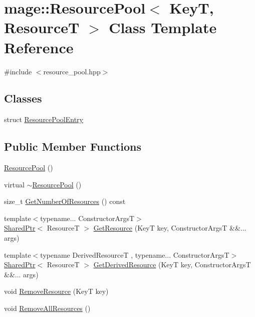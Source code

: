 \hypertarget{classmage_1_1_resource_pool}{}\section{mage\+:\+:Resource\+Pool$<$ KeyT, ResourceT $>$ Class Template Reference}
\label{classmage_1_1_resource_pool}


{\ttfamily \#include $<$resource\+\_\+pool.\+hpp$>$}

\subsection*{Classes}
\begin{DoxyCompactItemize}
\item 
struct \hyperlink{structmage_1_1_resource_pool_1_1_resource_pool_entry}{Resource\+Pool\+Entry}
\end{DoxyCompactItemize}
\subsection*{Public Member Functions}
\begin{DoxyCompactItemize}
\item 
\hyperlink{classmage_1_1_resource_pool_a590c1ebb30254714bedd7f821ff98241}{Resource\+Pool} ()
\item 
virtual \hyperlink{classmage_1_1_resource_pool_ae4fff3d951818d417f77965c2db265f6}{$\sim$\+Resource\+Pool} ()
\item 
size\+\_\+t \hyperlink{classmage_1_1_resource_pool_ae2f9964a1821c9b8cb38303a5a88c98e}{Get\+Number\+Of\+Resources} () const
\item 
{\footnotesize template$<$typename... Constructor\+ArgsT$>$ }\\\hyperlink{namespacemage_a1e01ae66713838a7a67d30e44c67703e}{Shared\+Ptr}$<$ ResourceT $>$ \hyperlink{classmage_1_1_resource_pool_add76506394983fe84bc2cb95cfd5f7e2}{Get\+Resource} (KeyT key, Constructor\+ArgsT \&\&... args)
\item 
{\footnotesize template$<$typename Derived\+ResourceT , typename... Constructor\+ArgsT$>$ }\\\hyperlink{namespacemage_a1e01ae66713838a7a67d30e44c67703e}{Shared\+Ptr}$<$ ResourceT $>$ \hyperlink{classmage_1_1_resource_pool_a2c1116cecf0a88953fa681f254de8680}{Get\+Derived\+Resource} (KeyT key, Constructor\+ArgsT \&\&... args)
\item 
void \hyperlink{classmage_1_1_resource_pool_acda87b2a5cc6ea3880f40df0ac6fb4d9}{Remove\+Resource} (KeyT key)
\item 
void \hyperlink{classmage_1_1_resource_pool_a83a33e15bd8f326d0ebc11b3f8e52a41}{Remove\+All\+Resources} ()
\end{DoxyCompactItemize}

